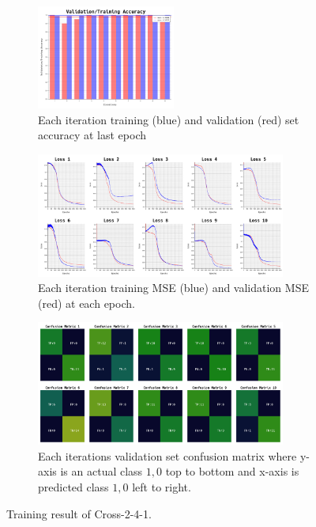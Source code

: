 \documentclass{article}
\begin{document}
\begin{figure}[ht]
	\begin{subfigure}{\textwidth}
		\centering
		\includegraphics[width=0.5\textwidth]{cross-2-8-1/acc}
		\caption{Each iteration training (blue) and validation (red) set accuracy at last epoch}
	\end{subfigure}
	\begin{subfigure}{\textwidth}
		\centering
		\includegraphics[width=0.9\textwidth]{cross-2-8-1/loss}
		\caption{Each iteration training MSE (blue) and validation MSE (red) at each epoch.}
	\end{subfigure}
	\begin{subfigure}{\textwidth}
		\centering
		\includegraphics[width=0.9\textwidth]{cross-2-8-1/confusion_matrix}
		\caption{Each iterations validation set confusion matrix where y-axis is an actual class $1, 0$ top to bottom and x-axis is predicted class $1, 0$ left to right.}
	\end{subfigure}
	\caption{Training result of Cross-2-4-1.}
	\label{fig:10}
\end{figure}
\FloatBarrier
\end{document}
